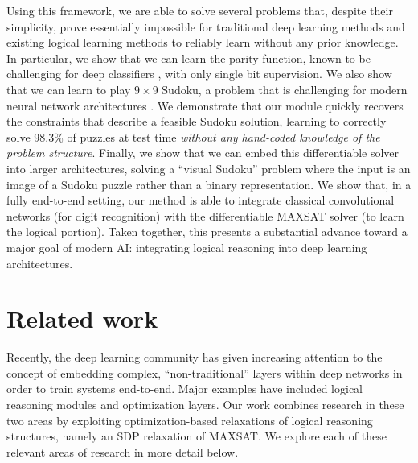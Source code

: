 \documentclass{article}
\begin{document}
	Using this framework, we are able to solve several problems that, despite their simplicity, prove essentially impossible for traditional deep learning methods and existing logical learning methods to reliably learn without any prior knowledge.  
	In particular, we show that we can learn the parity function, known to be challenging for deep classifiers \cite{shalev2017failures}, with only single bit supervision.  
	We also show that we can learn to play $9\times 9$ Sudoku, a problem that is challenging for modern neural network architectures \cite{palm2017recurrent}. 
	We demonstrate that our module quickly recovers the constraints that describe a feasible Sudoku solution, learning to correctly solve 98.3\% of puzzles at test time \emph{without any hand-coded knowledge of the problem structure}.
Finally, we show that we can embed this differentiable solver into larger architectures, solving a ``visual Sudoku'' problem where the input is an image of a Sudoku puzzle rather than a binary representation. We show that, in a fully end-to-end setting, our method is able to integrate classical convolutional networks (for digit recognition) with the differentiable MAXSAT solver (to learn the logical portion).  
	Taken together, this presents a substantial advance toward a major goal of modern AI: integrating logical reasoning into deep learning architectures.
	
	
	\section{Related work}
	
	Recently, the deep learning community has given increasing attention to the concept of embedding complex, ``non-traditional'' layers within deep networks in order to train systems end-to-end.
	Major examples have included logical reasoning modules and optimization layers. 
	Our work combines research in these two areas by exploiting optimization-based relaxations of logical reasoning structures, namely an SDP relaxation of MAXSAT.
	We explore each of these relevant areas of research in more detail below.
	
\end{document}
